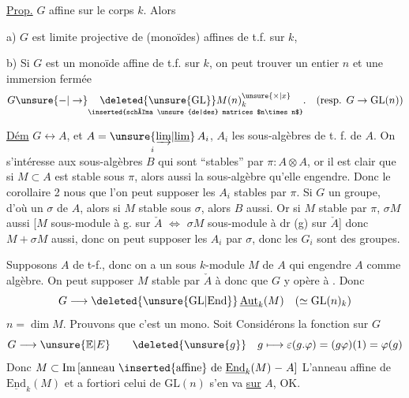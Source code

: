 \uline{Prop.} $G$   affine sur le corps $k$. Alors

a) $G$  est limite projective  de  (monoïdes) affines de t.f. sur $k$,  

b) Si $G$ est un monoïde  affine de t.f. sur $k$, on peut trouver un  entier $n$ et une immersion fermée
\[
 G\unsure{-|\to}\underset{\text{\inserted{schéma \unsure{de|des} matrices $n\times n$}}}{\deleted{\unsure{\mathrm{GL}}}M(n)_{k}^{\unsure{\times|x}}}.\quad
 (\text{resp. }G\to\mathrm{GL}(n))
\]

\uline{Dém} $G\longleftrightarrow A$,  et $A=\underset{i}{\unsure{\underrightarrow{\lim}|\underline{\lim}}}\,A_i$, $A_i$ les sous-algèbres de t. f. de $A$. On s'intéresse aux sous-algèbres $B$ qui sont ``stables'' par $\pi:A\otimes A$, or il est clair que si
$M\subset A$ est stable sous $\pi$, alors aussi la sous-algèbre  qu'elle engendre. Donc le corollaire 2 nous  que l'on peut supposer les $A_i$ stables par $\pi$. Si $G$ un groupe, d'où un 
$\sigma$ de $A$, alors si $M$ stable sous $\sigma$, alors  $B$ aussi. Or si $M$ stable par $\pi$, $\sigma M$ aussi [$M$ sous-module à g.  sur $\check A$ $\Longleftrightarrow$ $\sigma M$ sous-module à dr (g) sur $\check A$] donc $M+\sigma M$ aussi, donc on peut supposer les $A_i$   par $\sigma$, donc les $G_i$ sont des groupes.

Supposons  $A$ de t-f., donc on a un sous $k$-module  $M$ de $A$ qui engendre $A$ comme algèbre.  On peut supposer $M$ stable par $\check A$ à    donc que $G$ y opère à  . Donc
\[
 G\longrightarrow\deleted{\unsure{\mathrm{GL}|{\mathrm{End}}}}\,\underline{\mathrm{Aut}}_{k}(M)\quad(\simeq\mathrm{GL}(n)_{k})
\]
 $n=\dim M$. Prouvons que c'est un mono.  Soit  Considérons  la fonction sur $G$
\[
 G\longrightarrow\unsure{\mathbb E|E}\qquad \deleted{\unsure{g}}\quad
 g\longmapsto\varepsilon(g.\varphi)=(g\varphi)(1)=\varphi(g)
\]
 Donc  $M\subset\mathrm{Im}\,[\text{anneau }\inserted{\text{affine}}\text{ de }\underline{\mathrm{End}}_k(M)\mathrel{-}A]$  L'anneau affine de $\underline{\mathrm{End}}_k(M)$ et a fortiori celui de $\mathrm{GL}(n)$ s'en va \uline{sur} $A$, OK.
